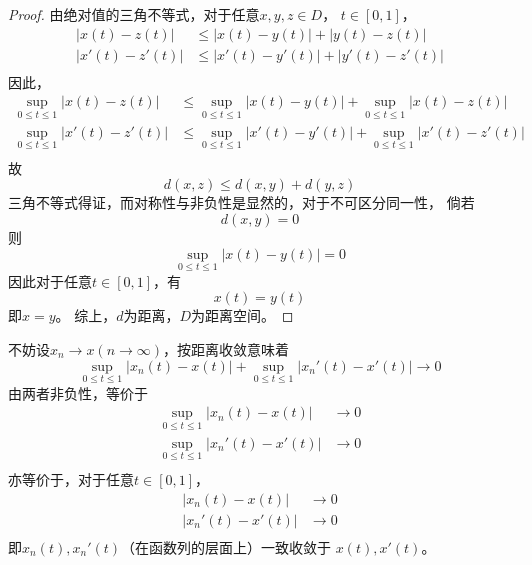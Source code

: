 \documentclass[cn]{homework}
\begin{document}
    \problem
    \begin{subproblem}
        \item 
        \begin{proof}
            \newcommand{\yz}{|y(t)-z(t)|}
            \newcommand{\yzp}{|y'(t)-z'(t)|}
            \newcommand{\xz}{|x(t)-z(t)|}
            \newcommand{\xzp}{|x'(t)-z'(t)|}
            \newcommand{\xy}{|x(t)-y(t)|}
            \newcommand{\xyp}{|x'(t)-y'(t)|}
            由绝对值的三角不等式，对于任意$x,y,z\in D$，
            $t\in[0,1]$，
            \begin{align*}
                \xz &\leq\xy+\yz\\
                \xzp &\leq\xyp+\yzp\\
            \end{align*}
            因此，
            \begin{align*}
                \sup_{0\leq t\leq 1}\xz
                &\leq\sup_{0\leq t\leq 1}\xy
                +\sup_{0\leq t\leq 1}\xz\\
                \sup_{0\leq t\leq 1}\xzp
                &\leq\sup_{0\leq t\leq 1}\xyp
                +\sup_{0\leq t\leq 1}\xzp\\
            \end{align*}
            故
            \[d(x,z)\leq d(x,y)+d(y,z)\]
            三角不等式得证，而对称性与非负性是显然的，对于不可区分同一性，
            倘若
            \[d(x,y)=0\]
            则
            \[\sup_{0\leq t\leq 1}\xy=0\]
            因此对于任意$t\in[0,1]$，有
            \[x(t)=y(t)\]
            即$x=y$。
            综上，$d$为距离，$D$为距离空间。
        \end{proof}

        \item
        \newcommand{\xnx}{|x_n(t)-x(t)|}
        \newcommand{\xnxp}{|x_n'(t)-x'(t)|}
        不妨设$x_n\to x(n\to\infty)$，按距离收敛意味着
        \[\sup_{0\leq t\leq 1}\xnx+\sup_{0\leq t\leq 1}\xnxp\to 0\]
        由两者非负性，等价于
        \begin{align*}
            \sup_{0\leq t\leq 1}\xnx&\to 0\\
            \sup_{0\leq t\leq 1}\xnxp&\to 0\\
        \end{align*}
        亦等价于，对于任意$t\in[0,1]$，
        \begin{align*}
            \xnx&\to 0\\
            \xnxp&\to 0\\
        \end{align*}
        即$x_n(t),x_n'(t)$（在函数列的层面上）一致收敛于
        $x(t),x'(t)$。


\end{subproblem}
\end{document}
